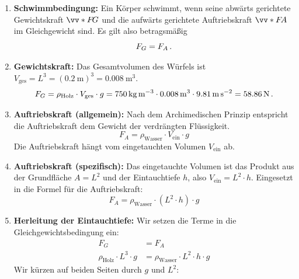 \documentclass[ngerman]{scrreprt}
\newenvironment{loesungbox}[1]
  {\needspace{5\baselineskip}\begin{loesungboxstyle}[frametitle={#1}]}
  {\end{loesungboxstyle}}
\begin{document}
\begin{loesungbox}{Lösung zu \Cref{aufg:auftrieb_holzklotz}}
\begin{enumerate}
    \item \textbf{Schwimmbedingung:} Ein Körper schwimmt, wenn seine abwärts gerichtete Gewichtskraft $\ivecS{F}{G}$ und die aufwärts gerichtete Auftriebskraft $\ivecS{F}{A}$ im Gleichgewicht sind. Es gilt also betragsmäßig
    \begin{equation}\label{eq: holz_gleichgewicht}
        F_G = F_A \,.
    \end{equation}
    \item \textbf{Gewichtskraft:} Das Gesamtvolumen des Würfels ist $V_{\text{ges}} = L^3 = (\SI{0.2}{\metre})^3 = \SI{0.008}{\metre\cubed}$.
    \begin{equation}\label{eq: holz_fg}
        F_G = \rho_{\text{Holz}} \cdot V_{\text{ges}} \cdot g = \SI{750}{\kg\per\m\cubed} \cdot \SI{0.008}{\m\cubed} \cdot \SI{9.81}{\m\per\s\squared} = \SI{58.86}{\newton} \mDot
    \end{equation}
    \item \textbf{Auftriebskraft (allgemein):} Nach dem Archimedischen Prinzip entspricht die Auftriebskraft dem Gewicht der verdrängten Flüssigkeit.
    \begin{equation}\label{eq: holz_fa_allg}
        F_A = \rho_{\text{Wasser}} \cdot V_{\text{ein}} \cdot g
    \end{equation}
    Die Auftriebskraft hängt vom eingetauchten Volumen $V_\text{ein}$ ab.
    \item \textbf{Auftriebskraft (spezifisch):} Das eingetauchte Volumen ist das Produkt aus der Grundfläche $A = L^2$ und der Eintauchtiefe $h$, also $V_{\text{ein}} = L^2 \cdot h$. Eingesetzt in die Formel für die Auftriebskraft:
    \begin{equation}\label{eq: holz_fa_spez}
        F_A = \rho_{\text{Wasser}} \cdot (L^2 \cdot h) \cdot g
    \end{equation}
    \item \textbf{Herleitung der Eintauchtiefe:} Wir setzen die Terme in die Gleichgewichtsbedingung ein:
    \begin{align}
        F_G &= F_A \\
        \rho_{\text{Holz}} \cdot L^3 \cdot g &= \rho_{\text{Wasser}} \cdot L^2 \cdot h \cdot g
    \end{align}
    Wir kürzen auf beiden Seiten durch $g$ und $L^2$:
    \begin{equation}\label{eq: holz_h_formel}

\end{equation}
\end{enumerate}
\end{loesungbox}
\end{document}
